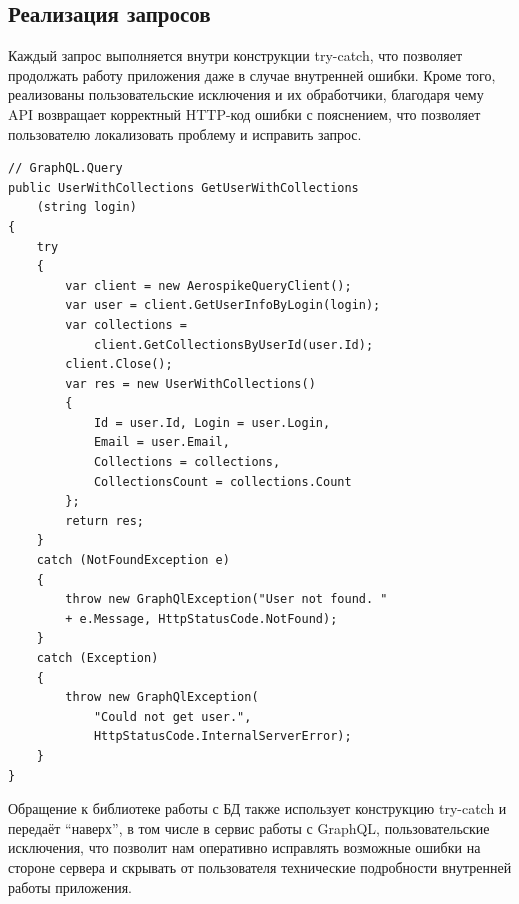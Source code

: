 \documentclass[14pt]{matmex-diploma-custom}
\begin{document}
\subsection{Реализация запросов}
Каждый запрос выполняется внутри конструкции try-catch, что позволяет продолжать работу приложения даже в случае внутренней ошибки. Кроме того, реализованы пользовательские исключения и их обработчики, благодаря чему API возвращает корректный HTTP-код ошибки с пояснением, что позволяет пользователю локализовать проблему и исправить запрос.
\lstset{style=sharpc}
\begin{lstlisting}
// GraphQL.Query
public UserWithCollections GetUserWithCollections
    (string login)
{
    try
    {
        var client = new AerospikeQueryClient();
        var user = client.GetUserInfoByLogin(login);
        var collections =
            client.GetCollectionsByUserId(user.Id);
        client.Close();
        var res = new UserWithCollections()
        {
            Id = user.Id, Login = user.Login,
            Email = user.Email,
            Collections = collections,
            CollectionsCount = collections.Count
        };
        return res;
    }
    catch (NotFoundException e)
    {
        throw new GraphQlException("User not found. "
        + e.Message, HttpStatusCode.NotFound);
    }
    catch (Exception)
    {
        throw new GraphQlException(
            "Could not get user.",
            HttpStatusCode.InternalServerError);
    }
}
\end{lstlisting}

Обращение к библиотеке работы с БД также использует конструкцию try-catch и передаёт ``наверх'', в том числе в сервис работы с GraphQL, пользовательские исключения, что позволит нам оперативно исправлять возможные ошибки на стороне сервера и скрывать от пользователя технические подробности внутренней работы приложения.
\end{document}
